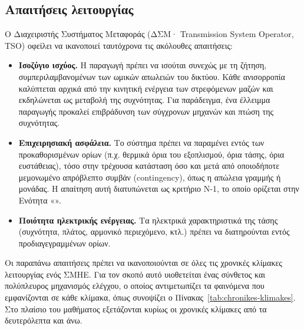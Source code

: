 

\subsection{Απαιτήσεις λειτουργίας}

Ο Διαχειριστής Συστήματος Μεταφοράς (ΔΣΜ· Transmission System Operator, TSO) οφείλει να
ικανοποιεί ταυτόχρονα τις ακόλουθες απαιτήσεις:

\begin{itemize}
\item \textbf{Ισοζύγιο ισχύος.} Η παραγωγή πρέπει να ισούται συνεχώς με τη ζήτηση, συμπεριλαμβανομένων των ωμικών απωλειών του δικτύου. Κάθε ανισορροπία καλύπτεται αρχικά από την κινητική ενέργεια των στρεφόμενων μαζών και εκδηλώνεται ως μεταβολή της συχνότητας. Για παράδειγμα, ένα
      έλλειμμα παραγωγής προκαλεί επιβράδυνση των σύγχρονων μηχανών και πτώση της συχνότητας.
\item \textbf{Επιχειρησιακή ασφάλεια.} Το σύστημα πρέπει να παραμένει εντός των προκαθορισμένων ορίων (π.χ. θερμικά όρια του εξοπλισμού, όρια τάσης, όρια ευστάθειας), τόσο στην τρέχουσα κατάσταση όσο και μετά από οποιοδήποτε μεμονωμένο απρόβλεπτο συμβάν (contingency), όπως η απώλεια γραμμής ή μονάδας. Η απαίτηση αυτή διατυπώνεται ως κριτήριο N-1, το οποίο ορίζεται στην Ενότητα
      «».
\item \textbf{Ποιότητα ηλεκτρικής ενέργειας.} Τα ηλεκτρικά χαρακτηριστικά της τάσης (συχνότητα, πλάτος, αρμονικό περιεχόμενο, κτλ.) πρέπει να
      διατηρούνται εντός προδιαγεγραμμένων ορίων.
\end{itemize}

Οι παραπάνω απαιτήσεις πρέπει να ικανοποιούνται σε όλες τις χρονικές κλίμακες λειτουργίας ενός
ΣΜΗΕ. Για τον σκοπό αυτό υιοθετείται ένας σύνθετος και πολύπλευρος μηχανισμός ελέγχου, ο οποίος
αντιμετωπίζει τα φαινόμενα που εμφανίζονται σε κάθε κλίμακα, όπως συνοψίζει ο
Πίνακας~\ref{tab:chronikes-klimakes}. Στο πλαίσιο του μαθήματος εξετάζονται κυρίως οι χρονικές
κλίμακες από τα δευτερόλεπτα και άνω.

